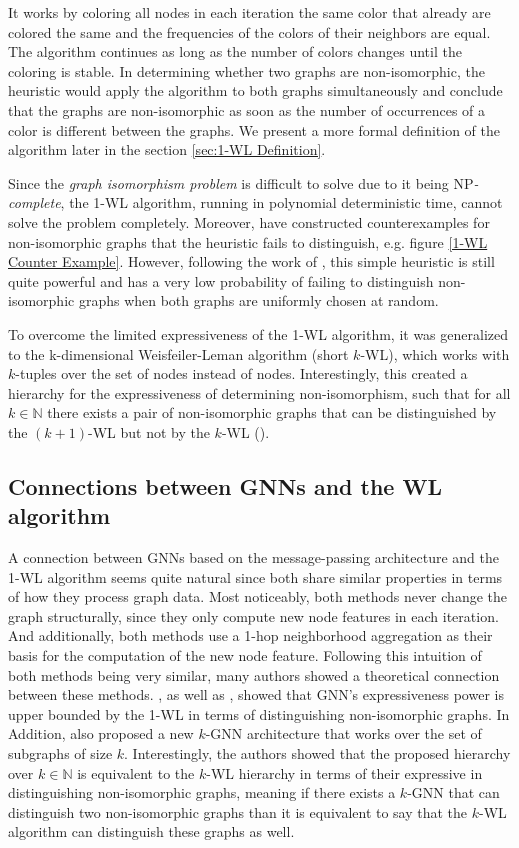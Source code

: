 \documentclass[11pt, dvipsnames, DIV=12]{scrreprt}
\theoremstyle{definition}
\begin{document}
It works by coloring all nodes in each iteration the same color that already are colored the same and the frequencies of the colors of their neighbors are equal. The algorithm continues as long as the number of colors changes until the coloring is stable.
In determining whether two graphs are non-isomorphic, the heuristic would apply the algorithm to both graphs simultaneously and conclude that the graphs are non-isomorphic as soon as the number of occurrences of a color is different between the graphs. We present a more formal definition of the algorithm later in the section \ref{sec:1-WL Definition}.

Since the \textit{graph isomorphism problem} is difficult to solve due to it being \textsf{NP}\textit{-complete}, the 1-WL algorithm, running in polynomial deterministic time, cannot solve the problem completely. Moreover, \cite{Cai1992} have constructed counterexamples for non-isomorphic graphs that the heuristic fails to distinguish, e.g. figure \ref{1-WL Counter Example}. However, following the work of \cite{Bab+1979}, this simple heuristic is still quite powerful and has a very low probability of failing to distinguish non-isomorphic graphs when both graphs are uniformly chosen at random.

To overcome the limited expressiveness of the 1-WL algorithm, it was generalized to the k-dimensional Weisfeiler-Leman algorithm (short $k$-WL), which works with $k$-tuples over the set of nodes instead of nodes. Interestingly, this created a hierarchy for the expressiveness of determining non-isomorphism, such that for all $k \in \mathbb{N}$ there exists a pair of non-isomorphic graphs that can be distinguished by the $(k+1)$-WL but not by the $k$-WL (\cite{Cai1992}).

\subsection{Connections between GNNs and the WL algorithm}\label{sec:conn gnn and 1wl}
A connection between GNNs based on the message-passing architecture and the 1-WL algorithm seems quite natural since both share similar properties in terms of how they process graph data. Most noticeably, both methods never change the graph structurally, since they only compute new node features in each iteration. And additionally, both methods use a 1-hop neighborhood aggregation as their basis for the computation of the new node feature. Following this intuition of both methods being very similar, many authors showed a theoretical connection between these methods. \cite{Morris2018}, as well as \cite{Xu2018}, showed that GNN's expressiveness power is upper bounded by the 1-WL in terms of distinguishing non-isomorphic graphs. In Addition, \cite{Morris2018} also proposed a new $k$-GNN architecture that works over the set of subgraphs of size $k$. Interestingly, the authors showed that the proposed hierarchy over $k \in \mathbb{N}$ is equivalent to the $k$-WL hierarchy in terms of their expressive in distinguishing non-isomorphic graphs, meaning if there exists a $k$-GNN that can distinguish two non-isomorphic graphs than it is equivalent to say that the $k$-WL algorithm can distinguish these graphs as well.
\end{document}
